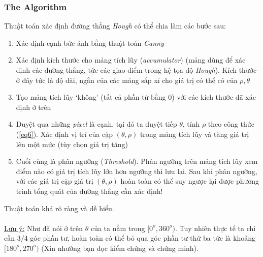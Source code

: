 \documentclass{article}
\begin{document}
    \subsubsection{The Algorithm}
    Thuật toán xác định đường thẳng \textit{Hough} có thể chia làm các bước sau:
    \begin{enumerate}
        \item Xác định cạnh bức ảnh bằng thuật toán \textit{Canny}
        \item Xác định kích thước cho mảng tích lũy (\textit{accumulator}) (mảng dùng để xác định các đường thẳng, tức các giao điểm trong hệ tọa độ \textit{Hough}). Kích thước ở đây tức là độ dài, ngắn của các mảng sấp xỉ cho giá trị có thể có của $\rho, \theta$
        \item Tạo mảng tích lũy `không' (tất cả phần tử bằng 0) với các kích thước đã xác định ở trên
        \item Duyệt qua những \textit{pixel} là cạnh, tại đó ta duyệt tiếp $\theta$, tính $\rho$ theo công thức (\ref{eq6}). Xác định vị trí của cặp $(\theta,\rho)$ trong mảng tích lũy và tăng giá trị lên một mức (tùy chọn giá trị tăng)
        \item Cuối cùng là phân ngưỡng (\textit{Threshold}). Phân ngưỡng trên mảng tích lũy xem điểm nào có giá trị tích lũy lớn hơn ngưỡng thì lưu lại. Sau khi phân ngưỡng, với các giá trị cặp giá trị $(\theta, \rho)$ hoàn toàn có thể suy ngược lại được phương trình tổng quát của đường thẳng cần xác định!
    \end{enumerate}
    Thuật toán khá rõ ràng và dễ hiểu. \\\\
    \underline{Lưu ý:} Như đã nói ở trên $\theta$ của ta nằm trong $[0^o,360^o)$. Tuy nhiên thực tế ta chỉ cần $3/4$ góc phần tư, hoàn toàn có thể bỏ qua góc phần tư thứ ba tức là khoảng $[180^o,270^o)$ (Xin nhường bạn đọc kiểm chứng và chứng minh).
\end{document}
